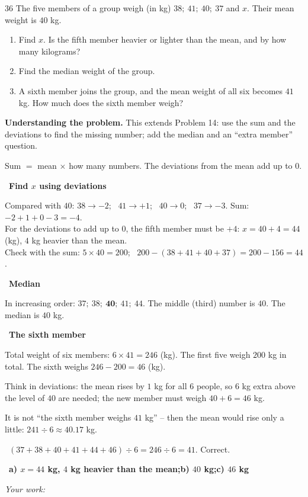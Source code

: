 \documentclass[11pt]{article}
\newif\ifsol \solfalse
\providecommand{\AnsWord}{Đáp số}
\newcommand{\ans}[1]{\par\smallskip{\bfseries\color{tmGreen!88!black}\AnsWord:}\ {\bfseries\color{AnsRed}#1}\par}
\newcommand{\probsol}[1]{%
  \begin{lrbox}{\solmeasure}\begin{minipage}{\dimexpr\linewidth-24pt\relax}#1\end{minipage}\end{lrbox}%
  \ifsol
    \begin{solbox}#1\end{solbox}%
  \else
    \setlength{\solht}{\dimexpr\ht\solmeasure+\dp\solmeasure+0.85cm\relax}%
    \ifdim\solht<1.35cm\setlength{\solht}{1.35cm}\fi
    \ifdim\solht>\StudentMaxWork\setlength{\solht}{\StudentMaxWork}\fi
    \begin{tcolorbox}[colback=white,colframe=Line,boxrule=0.8pt,arc=5pt,
      left=8pt,right=8pt,top=4pt,bottom=4pt,height=\solht]{\footnotesize\color{Slate}\itshape\WorkWord}\end{tcolorbox}%
  \fi}
\newlength{\StudentMaxWork}\setlength{\StudentMaxWork}{7.5cm}
\newcommand{\step}[2]{\par\smallskip\noindent{\bfseries\color{tmBlue!85!black}\StepWord~#1.}\ {\bfseries #2}\par\nopagebreak}
\newcommand{\verify}[1]{\par\smallskip\noindent{\bfseries\color{tmGreen!80!black}\faCheckCircle\ \CheckWord}\ #1\par}
\def\WorkWord{Your work:}
\def\AnsWord{Answer}
\def\StepWord{Step}
\def\CheckWord{Check:}
\begin{document}
\begin{probbox}{36}{\relax}
The five members of a group weigh (in kg) $38;\ 41;\ 40;\ 37$ and $x$. Their mean weight is $40$ kg.
\begin{enumerate}[label=\alph*),leftmargin=1.6em,itemsep=0pt,topsep=2pt]
  \item Find $x$. Is the fifth member heavier or lighter than the mean, and by how many kilograms?
  \item Find the median weight of the group.
  \item A sixth member joins the group, and the mean weight of all six becomes $41$ kg. How much does the sixth member weigh?
\end{enumerate}
\end{probbox}
\probsol{
\textbf{Understanding the problem.} This extends Problem 14: use the sum and the deviations to find the missing number; add
the median and an ``extra member'' question.
\begin{recallbox}Sum $=$ mean $\times$ how many numbers. The deviations from the mean add up to $0$.\end{recallbox}
\step{1}{Find $x$ using deviations}
Compared with $40$: $38 \to -2$; \ $41 \to +1$; \ $40 \to 0$; \ $37 \to -3$. Sum: $-2 + 1 + 0 - 3 = -4$.\\
For the deviations to add up to $0$, the fifth member must be $+4$: $x = 40 + 4 = 44$ (kg), $4$ kg heavier than the mean.\\
Check with the sum: $5\times 40 = 200$; \ $200 - (38 + 41 + 40 + 37) = 200 - 156 = 44$.
\step{2}{Median}
In increasing order: $37;\ 38;\ \mathbf{40};\ 41;\ 44$. The middle (third) number is $40$. The median is $40$ kg.
\step{3}{The sixth member}
Total weight of six members: $6\times 41 = 246$ (kg). The first five weigh $200$ kg in total. The sixth weighs $246 - 200 = 46$ (kg).
\begin{tipbox}Think in deviations: the mean rises by $1$ kg for all $6$ people, so $6$ kg extra above the level of $40$ are needed;
the new member must weigh $40 + 6 = 46$ kg.\end{tipbox}
\begin{warnbox}It is not ``the sixth member weighs $41$ kg'' -- then the mean would rise only a little: $241 \div 6 \approx 40.17$ kg.\end{warnbox}
\verify{$(37 + 38 + 40 + 41 + 44 + 46) \div 6 = 246 \div 6 = 41$. Correct.}
\ans{a) $x = 44$ kg, $4$ kg heavier than the mean;\quad b) $40$ kg;\quad c) $46$ kg}
}
\end{document}
